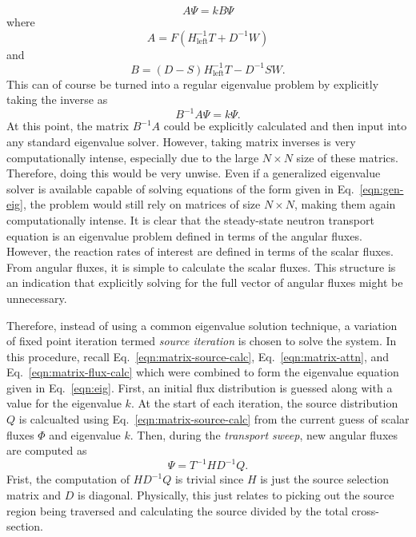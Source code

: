 \begin{equation}
A \Psi = k B \Psi
\label{eqn:gen-eig}
\end{equation}
where
\begin{equation}
A = F \left(H_{\text{left}}^{-1} T + D^{-1} W \right)
\end{equation}
and
\begin{equation}
B = \left(D-S\right) H_{\text{left}}^{-1} T -  D^{-1} S W.
\end{equation}
This can of course be turned into a regular eigenvalue problem by explicitly taking the inverse as
\begin{equation}
B^{-1}A \Psi = k \Psi.
\label{eqn:eig}
\end{equation}
At this point, the matrix $B^{-1}A$ could be explicitly calculated and then input into any standard eigenvalue solver. However, taking matrix inverses is very computationally intense, especially due to the large $N \times N$ size of these matrics. Therefore, doing this would be very unwise. Even if a generalized eigenvalue solver is available capable of solving equations of the form given in Eq.~\ref{eqn:gen-eig}, the problem would still rely on matrices of size $N \times N$, making them again computationally intense. It is clear that the steady-state neutron transport equation is an eigenvalue problem defined in terms of the angular fluxes. However, the reaction rates of interest are defined in terms of the scalar fluxes. From angular fluxes, it is simple to calculate the scalar fluxes. This structure is an indication that explicitly solving for the full vector of angular fluxes might be unnecessary.

Therefore, instead of using a common eigenvalue solution technique, a variation of fixed point iteration termed \textit{source iteration} is chosen to solve the system. In this procedure, recall Eq.~\ref{eqn:matrix-source-calc}, Eq.~\ref{eqn:matrix-attn}, and Eq.~\ref{eqn:matrix-flux-calc} which were combined to form the eigenvalue equation given in Eq.~\ref{eqn:eig}. First, an initial flux distribution is guessed along with a value for the eigenvalue $k$. At the start of each iteration, the source distribution $Q$ is calcualted using Eq.~\ref{eqn:matrix-source-calc} from the current guess of scalar fluxes $\Phi$ and eigenvalue $k$. Then, during the \textit{transport sweep}, new angular fluxes are computed as
\begin{equation}
\Psi = T^{-1} H D^{-1} Q.
\end{equation}
Frist, the computation of $HD^{-1}Q$ is trivial since $H$ is just the source selection matrix and $D$ is diagonal. Physically, this just relates to picking out the source region being traversed and calculating the source divided by the total cross-section.

